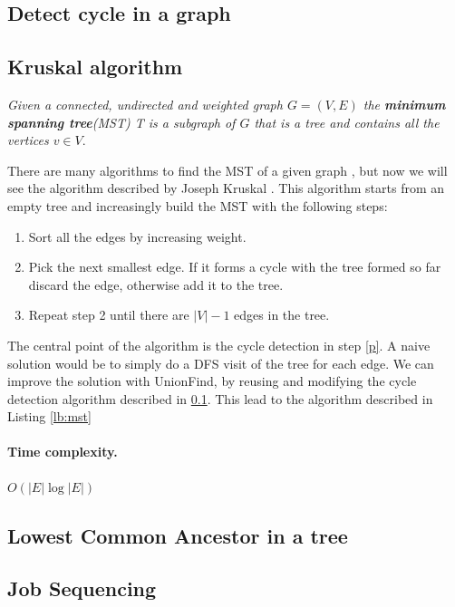 \documentclass{article}
\begin{document}
\subsection{Detect cycle in a graph} \label{loop}

\subsection{Kruskal algorithm}
\begin{center}
    \emph{Given a connected, undirected  and weighted  graph $G = (V,E)$ the \textbf{minimum spanning tree}(MST) T
    is a subgraph of $G$ that is a tree and contains all the vertices $v \in V$}.   
\end{center}


There are many algorithms to find the MST of a given graph \cite{prim1957shortest} \cite{nevsetvril2001otakar},
but now we will see the algorithm described by Joseph Kruskal \cite{kruskal1956shortest}.
This algorithm starts from an empty tree and increasingly build the MST with the following steps:
\begin{enumerate}
    \item Sort all the edges by increasing weight.
    \item \label{p}Pick the next smallest edge. If it forms a cycle with the  tree formed so far discard the edge, otherwise
    add it to the tree.
    \item Repeat step 2 until there are $|V| - 1$ edges in the tree.
\end{enumerate}
The central point of the algorithm is the cycle detection in step \ref{p}. A naive solution would be to simply do a DFS  visit of the tree for each edge.
We can improve the solution with UnionFind,  by reusing and modifying the cycle detection algorithm described in \ref{loop}. This lead to the algorithm described in Listing \ref{lb:mst} 
\paragraph{Time complexity.} $O(|E|\log|E|)$


\subsection{Lowest Common Ancestor in a tree}

\subsection{Job Sequencing}



\end{document}
